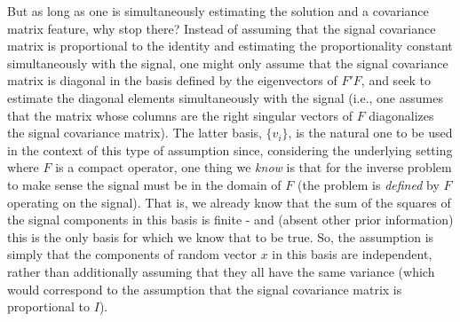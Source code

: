 \documentclass{amsart}
\numberwithin{equation}{section}
\theoremstyle{definition}
\numberwithin{theorem}{section}
\begin{document}
{But as long as one is simultaneously estimating the solution and a covariance matrix feature, why stop there?   Instead of assuming that the   signal covariance matrix is proportional to the identity and estimating the proportionality constant simultaneously with the signal, one might only assume that the signal covariance matrix is diagonal in the basis defined by the eigenvectors of $F'F$, and seek to estimate the diagonal elements simultaneously with the signal (i.e., one assumes  that the matrix whose columns are the right singular vectors of  $F$ diagonalizes the signal covariance matrix).
The latter basis, $\{v_i\}$, is the natural one to be used in the context of this type of assumption since, considering the underlying setting where $F$ is a compact operator, one thing we {\it know} is that for the inverse problem to make sense the signal must be in the domain of $F$ (the problem is {\it defined} by $F$ operating on the signal). That is, we already know that the sum of the squares of the signal components in this basis is finite - and (absent other prior information) this is the only basis for which we know that to be true.  So, the assumption is simply that the components of random vector $x$ in this basis are independent, rather than additionally assuming that they all have the same variance (which would correspond to the assumption that the signal covariance matrix is proportional to $I$).

}
\end{document}

